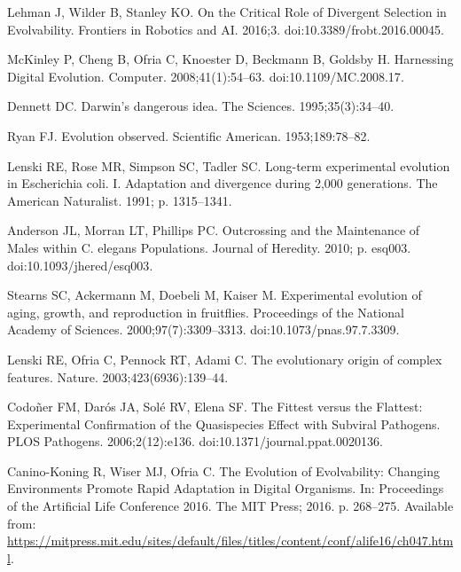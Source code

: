 \documentclass[10pt,letterpaper,final]{article}
\begin{document}
\begin{thebibliography}{10}
Lehman J, Wilder B, Stanley KO.
\newblock On the {Critical} {Role} of {Divergent} {Selection} in
  {Evolvability}.
\newblock Frontiers in Robotics and AI. 2016;3.
\newblock doi:{10.3389/frobt.2016.00045}.

McKinley P, Cheng B, Ofria C, Knoester D, Beckmann B, Goldsby H.
\newblock Harnessing {Digital} {Evolution}.
\newblock Computer. 2008;41(1):54--63.
\newblock doi:{10.1109/MC.2008.17}.

Dennett DC.
\newblock Darwin's dangerous idea.
\newblock The Sciences. 1995;35(3):34--40.

Ryan FJ.
\newblock Evolution observed.
\newblock Scientific American. 1953;189:78--82.

Lenski RE, Rose MR, Simpson SC, Tadler SC.
\newblock Long-term experimental evolution in {Escherichia} coli. {I}.
  {Adaptation} and divergence during 2,000 generations.
\newblock The American Naturalist. 1991; p. 1315--1341.

Anderson JL, Morran LT, Phillips PC.
\newblock Outcrossing and the {Maintenance} of {Males} within {C}. elegans
  {Populations}.
\newblock Journal of Heredity. 2010; p. esq003.
\newblock doi:{10.1093/jhered/esq003}.

Stearns SC, Ackermann M, Doebeli M, Kaiser M.
\newblock Experimental evolution of aging, growth, and reproduction in
  fruitflies.
\newblock Proceedings of the National Academy of Sciences.
  2000;97(7):3309--3313.
\newblock doi:{10.1073/pnas.97.7.3309}.

Lenski RE, Ofria C, Pennock RT, Adami C.
\newblock The evolutionary origin of complex features.
\newblock Nature. 2003;423(6936):139--44.

Codoñer FM, Darós JA, Solé RV, Elena SF.
\newblock The {Fittest} versus the {Flattest}: {Experimental} {Confirmation} of
  the {Quasispecies} {Effect} with {Subviral} {Pathogens}.
\newblock PLOS Pathogens. 2006;2(12):e136.
\newblock doi:{10.1371/journal.ppat.0020136}.

Canino-Koning R, Wiser MJ, Ofria C.
\newblock The {Evolution} of {Evolvability}: {Changing} {Environments}
  {Promote} {Rapid} {Adaptation} in {Digital} {Organisms}.
\newblock In: Proceedings of the {Artificial} {Life} {Conference} 2016. The MIT
  Press; 2016. p. 268--275.
\newblock Available from:
  \url{https://mitpress.mit.edu/sites/default/files/titles/content/conf/alife16/ch047.html}.


\end{thebibliography}
\end{document}
